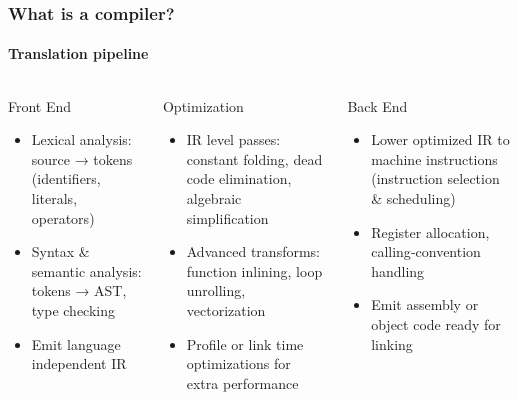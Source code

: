 \documentclass[aspectratio=169]{beamer}
\begin{document}
\begin{frame}
	\frametitle{What is a compiler?}
	\framesubtitle{Translation pipeline}

	\begin{columns}[T]
		\begin{column}{0.3\textwidth}
			Front End
			\begin{itemize}
				\item Lexical analysis: source → tokens (identifiers, literals, operators)
				\item Syntax \& semantic analysis: tokens → AST, type checking
				\item Emit language independent IR
			\end{itemize}
		\end{column}
		\begin{column}{0.4\textwidth}
			Optimization
			\begin{itemize}
				\item IR level passes: constant folding, dead code elimination, algebraic simplification
				\item Advanced transforms: function inlining, loop unrolling, vectorization
				\item Profile  or link time optimizations for extra performance
			\end{itemize}
		\end{column}
		\begin{column}{0.3\textwidth}
			Back End
			\begin{itemize}
				\item Lower optimized IR to machine instructions (instruction selection \& scheduling)
				\item Register allocation, calling‐convention handling
				\item Emit assembly or object code ready for linking
			\end{itemize}
		\end{column}
	\end{columns}
\end{frame}
\end{document}
